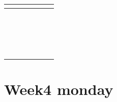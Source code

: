 \documentclass[12pt, oneside]{article}
\begin{document}
\begin{tabular}{|c|c|c|c|c|c|c|}
\hline
\multicolumn{7}{|c|}{\phantom{A}}\\
\hline
\phantom{AA} & \phantom{AA}& \phantom{AA}& \phantom{AA}& \phantom{AA}& \phantom{AA}& \phantom{AA} \\
\hline
\multicolumn{7}{|c|}{\phantom{A}}\\
\hline
\phantom{AA} & \phantom{AA}& \phantom{AA}& \phantom{AA}& \phantom{AA}& \phantom{AA}& \phantom{AA} \\
\hline
\multicolumn{7}{|c|}{\phantom{A}}\\
\hline
\phantom{AA} & \phantom{AA}& \phantom{AA}& \phantom{AA}& \phantom{AA}& \phantom{AA}& \phantom{AA} \\
\hline
\multicolumn{7}{|c|}{\phantom{A}}\\
\hline
\phantom{AA} & \phantom{AA}& \phantom{AA}& \phantom{AA}& \phantom{AA}& \phantom{AA}& \phantom{AA} \\
\hline
\multicolumn{7}{|c|}{\phantom{A}}\\
\hline
\phantom{AA} & \phantom{AA}& \phantom{AA}& \phantom{AA}& \phantom{AA}& \phantom{AA}& \phantom{AA} \\
\hline
\multicolumn{7}{|c|}{\phantom{A}}\\
\hline
\phantom{AA} & \phantom{AA}& \phantom{AA}& \phantom{AA}& \phantom{AA}& \phantom{AA}& \phantom{AA} \\
\hline
\multicolumn{7}{|c|}{\phantom{A}}\\
\hline
\phantom{AA} & \phantom{AA}& \phantom{AA}& \phantom{AA}& \phantom{AA}& \phantom{AA}& \phantom{AA} \\
\hline
\multicolumn{7}{|c|}{\phantom{A}}\\
\hline
\phantom{AA} & \phantom{AA}& \phantom{AA}& \phantom{AA}& \phantom{AA}& \phantom{AA}& \phantom{AA} \\
\hline
\multicolumn{7}{|c|}{\phantom{A}}\\
\hline
\phantom{AA} & \phantom{AA}& \phantom{AA}& \phantom{AA}& \phantom{AA}& \phantom{AA}& \phantom{AA} \\
\hline
\multicolumn{7}{|c|}{\phantom{A}}\\
\hline
\phantom{AA} & \phantom{AA}& \phantom{AA}& \phantom{AA}& \phantom{AA}& \phantom{AA}& \phantom{AA} \\
\hline
\end{tabular}
 \vfill
\section*{Week4 monday}
\end{document}
